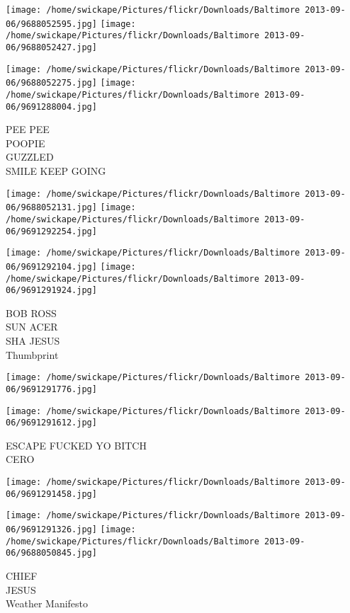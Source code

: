 \documentclass[10pt,letterpaper]{article}
\begin{document}
\texttt{[image: /home/swickape/Pictures/flickr/Downloads/Baltimore 2013-09-06/9688052595.jpg]}
\texttt{[image: /home/swickape/Pictures/flickr/Downloads/Baltimore 2013-09-06/9688052427.jpg]}

\texttt{[image: /home/swickape/Pictures/flickr/Downloads/Baltimore 2013-09-06/9688052275.jpg]}
\texttt{[image: /home/swickape/Pictures/flickr/Downloads/Baltimore 2013-09-06/9691288004.jpg]}

PEE PEE\\
POOPIE\\
GUZZLED\\
SMILE KEEP GOING
\pagebreak

\texttt{[image: /home/swickape/Pictures/flickr/Downloads/Baltimore 2013-09-06/9688052131.jpg]}
\texttt{[image: /home/swickape/Pictures/flickr/Downloads/Baltimore 2013-09-06/9691292254.jpg]}

\texttt{[image: /home/swickape/Pictures/flickr/Downloads/Baltimore 2013-09-06/9691292104.jpg]}
\texttt{[image: /home/swickape/Pictures/flickr/Downloads/Baltimore 2013-09-06/9691291924.jpg]}

BOB ROSS\\
SUN ACER\\
SHA JESUS\\
Thumbprint
\pagebreak

\texttt{[image: /home/swickape/Pictures/flickr/Downloads/Baltimore 2013-09-06/9691291776.jpg]}

\vspace{0.25in}
\texttt{[image: /home/swickape/Pictures/flickr/Downloads/Baltimore 2013-09-06/9691291612.jpg]}

ESCAPE FUCKED YO BITCH\\
CERO
\pagebreak

\texttt{[image: /home/swickape/Pictures/flickr/Downloads/Baltimore 2013-09-06/9691291458.jpg]}

\vspace{0.25in}
\texttt{[image: /home/swickape/Pictures/flickr/Downloads/Baltimore 2013-09-06/9691291326.jpg]}
\texttt{[image: /home/swickape/Pictures/flickr/Downloads/Baltimore 2013-09-06/9688050845.jpg]}

CHIEF\\
JESUS\\
Weather Manifesto
\pagebreak
\end{document}
